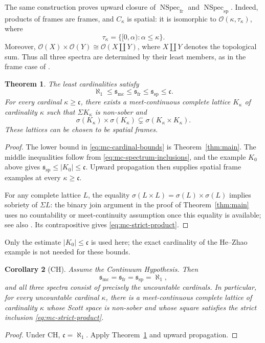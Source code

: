 \documentclass[preprint,11pt]{elsarticle}
\newtheorem{theorem}{Theorem}[section]
\newtheorem{corollary}[theorem]{Corollary}
\theoremstyle{definition}
\theoremstyle{remark}
\numberwithin{equation}{section}
\newcommand{\Sc}{\sigma}
\newcommand{\Sig}{\Sigma}
\newcommand{\Specfr}{\operatorname{NSpec}_{\mathrm{fr}}}
\newcommand{\Specsp}{\operatorname{NSpec}_{\mathrm{sp}}}
\newcommand{\smc}{\mathfrak{s}_{\mathrm{mc}}}
\newcommand{\sfr}{\mathfrak{s}_{\mathrm{fr}}}
\newcommand{\ssp}{\mathfrak{s}_{\mathrm{sp}}}
\newcommand{\cc}{\mathfrak{c}}
\begin{document}
The same construction proves upward closure of $\Specfr$ and $\Specsp$. Indeed, products of frames are frames, and $C_\kappa$ is spatial: it is isomorphic to $\mathcal O(\kappa,\tau_\kappa)$, where
\[
 \tau_\kappa=\{[0,\alpha):\alpha\leq\kappa\}.
\]
Moreover, $\mathcal O(X)\times\mathcal O(Y)\cong\mathcal O(X\coprod Y)$, where $X\coprod Y$ denotes the topological sum. Thus all three spectra are determined by their least members, as in the frame case of \cite[Section~5.2]{XuFrames}.

\begin{theorem}\label{thm:mc-cardinal-bounds}
The least cardinalities satisfy
\begin{equation}\label{eq:mc-cardinal-bounds}
 \aleph_1\leq\smc\leq\sfr\leq\ssp\leq\cc.
\end{equation}
For every cardinal $\kappa\geq\cc$, there exists a meet-continuous complete lattice $K_\kappa$ of cardinality $\kappa$ such that $\Sig K_\kappa$ is non-sober and
\begin{equation}\label{eq:mc-strict-product}
 \Sc(K_\kappa)\times\Sc(K_\kappa)
 \subsetneq\Sc(K_\kappa\times K_\kappa).
\end{equation}
These lattices can be chosen to be spatial frames.
\end{theorem}
\begin{proof}
The lower bound in \eqref{eq:mc-cardinal-bounds} is Theorem~\ref{thm:main}. The middle inequalities follow from \eqref{eq:mc-spectrum-inclusions}, and the example $K_0$ above gives $\ssp\leq|K_0|\leq\cc$. Upward propagation then supplies spatial frame examples at every $\kappa\geq\cc$.

For any complete lattice $L$, the equality $\Sc(L\times L)=\Sc(L)\times\Sc(L)$ implies sobriety of $\Sig L$: the binary join argument in the proof of Theorem~\ref{thm:main} uses no countability or meet-continuity assumption once this equality is available; see also \cite[Proposition~5.1 and Corollary~5.2]{LawsonXu}. Its contrapositive gives \eqref{eq:mc-strict-product}.
\end{proof}

Only the estimate $|K_0|\leq\cc$ is used here; the exact cardinality of the He--Zhao example is not needed for these bounds.

\begin{corollary}[CH]\label{cor:mc-ch}
Assume the Continuum Hypothesis. Then
\[
 \smc=\sfr=\ssp=\aleph_1,
\]
and all three spectra consist of precisely the uncountable cardinals. In particular, for every uncountable cardinal $\kappa$, there is a meet-continuous complete lattice of cardinality $\kappa$ whose Scott space is non-sober and whose square satisfies the strict inclusion \eqref{eq:mc-strict-product}.
\end{corollary}
\begin{proof}
Under CH, $\cc=\aleph_1$. Apply Theorem~\ref{thm:mc-cardinal-bounds} and upward propagation.
\end{proof}
\end{document}
